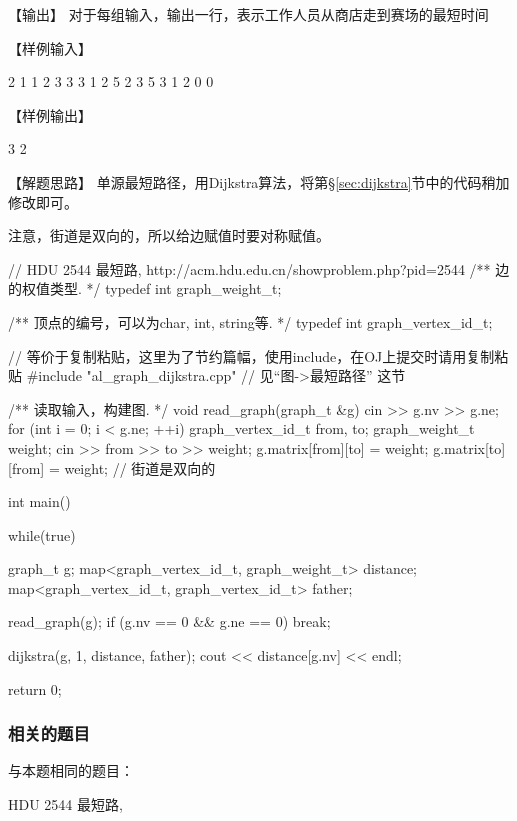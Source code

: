 【输出】
对于每组输入，输出一行，表示工作人员从商店走到赛场的最短时间

【样例输入】
\begin{Code}
    2 1
    1 2 3
    3 3
    1 2 5
    2 3 5
    3 1 2
    0 0
\end{Code}

【样例输出】
\begin{Code}
    3
    2
\end{Code}

【解题思路】
单源最短路径，用Dijkstra算法，将第\S\ref{sec:dijkstra}节中的代码稍加修改即可。

注意，街道是双向的，所以给边赋值时要对称赋值。

\begin{Codex}[label=hdu_2544.cpp]
    // HDU 2544 最短路, http://acm.hdu.edu.cn/showproblem.php?pid=2544
    /** 边的权值类型. */
    typedef int graph_weight_t;

    /** 顶点的编号，可以为char, int, string等. */
    typedef int graph_vertex_id_t;

    // 等价于复制粘贴，这里为了节约篇幅，使用include，在OJ上提交时请用复制粘贴
    #include "al_graph_dijkstra.cpp"  // 见“图->最短路径” 这节

    /** 读取输入，构建图. */
    void read_graph(graph_t &g) {
        cin >> g.nv >> g.ne;
        for (int i = 0; i < g.ne; ++i) {
            graph_vertex_id_t from, to;
            graph_weight_t weight;
            cin >> from >> to >> weight;
            g.matrix[from][to] = weight;
            g.matrix[to][from] = weight;  // 街道是双向的
        }
    }

    int main() {
        while(true) {
            graph_t g;
            map<graph_vertex_id_t, graph_weight_t> distance;
            map<graph_vertex_id_t, graph_vertex_id_t> father;

            read_graph(g);
            if (g.nv == 0 && g.ne == 0) break;

            dijkstra(g, 1, distance, father);
            cout << distance[g.nv] << endl;
        }
        return 0;
    }
\end{Codex}

\subsubsection{相关的题目}
与本题相同的题目：
\begindot
\item HDU 2544 最短路, 
\myenddot

